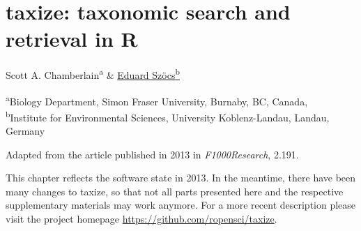 
\chapter{taxize: taxonomic search and retrieval in R}
\label{sec:taxize} 
 
\begin{sloppypar}

\bigskip
Scott A. Chamberlain\textsuperscript{a} \& \underline{Eduard Szöcs\textsuperscript{b}}

\bigskip
\small
\noindent 
\textsuperscript{a}Biology Department, Simon Fraser University, Burnaby, BC, Canada,\\
\textsuperscript{b}Institute for Environmental Sciences, University Koblenz-Landau, Landau, Germany 

\bigskip 
\normalsize
\noindent 
Adapted from the article published in 2013 in \emph{F1000Research}, 2.191.

\bigskip
\noindent
This chapter reflects the software state in 2013.
In the meantime, there have been many changes to taxize, so that not all parts presented here and the respective supplementary materials may work anymore. 
For a more recent description please visit the project homepage \url{https://github.com/ropensci/taxize}.

\end{sloppypar}

\cleardoublepage



